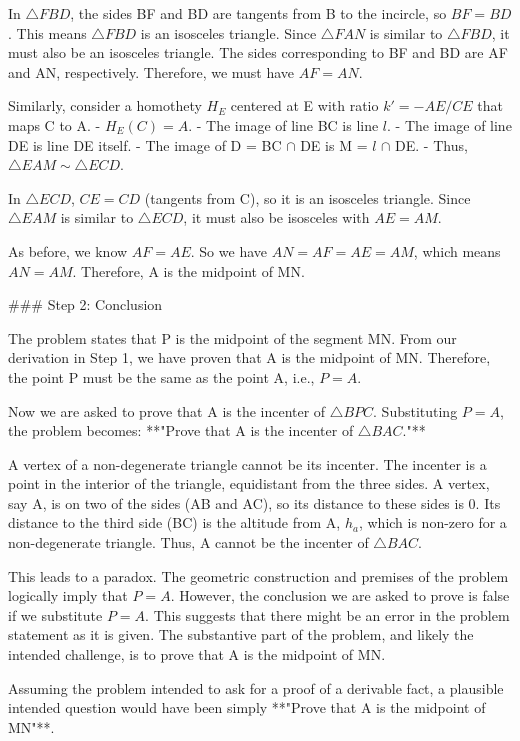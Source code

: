 In $\triangle FBD$, the sides BF and BD are tangents from B to the incircle, so $BF = BD$. This means $\triangle FBD$ is an isosceles triangle.
Since $\triangle FAN$ is similar to $\triangle FBD$, it must also be an isosceles triangle. The sides corresponding to BF and BD are AF and AN, respectively. Therefore, we must have $AF = AN$.

Similarly, consider a homothety $H_E$ centered at E with ratio $k' = -AE/CE$ that maps C to A.
-   $H_E(C) = A$.
-   The image of line BC is line $l$.
-   The image of line DE is line DE itself.
-   The image of D = BC $\cap$ DE is M = $l$ $\cap$ DE.
-   Thus, $\triangle EAM \sim \triangle ECD$.

In $\triangle ECD$, $CE = CD$ (tangents from C), so it is an isosceles triangle.
Since $\triangle EAM$ is similar to $\triangle ECD$, it must also be isosceles with $AE=AM$.

As before, we know $AF=AE$. So we have $AN = AF = AE = AM$, which means $AN = AM$.
Therefore, A is the midpoint of MN.

### Step 2: Conclusion

The problem states that P is the midpoint of the segment MN. From our derivation in Step 1, we have proven that A is the midpoint of MN. Therefore, the point P must be the same as the point A, i.e., $P=A$.

Now we are asked to prove that A is the incenter of $\triangle BPC$.
Substituting $P=A$, the problem becomes: **"Prove that A is the incenter of $\triangle BAC$."**

A vertex of a non-degenerate triangle cannot be its incenter. The incenter is a point in the interior of the triangle, equidistant from the three sides. A vertex, say A, is on two of the sides (AB and AC), so its distance to these sides is 0. Its distance to the third side (BC) is the altitude from A, $h_a$, which is non-zero for a non-degenerate triangle. Thus, A cannot be the incenter of $\triangle BAC$.

This leads to a paradox. The geometric construction and premises of the problem logically imply that $P=A$. However, the conclusion we are asked to prove is false if we substitute $P=A$. This suggests that there might be an error in the problem statement as it is given. The substantive part of the problem, and likely the intended challenge, is to prove that A is the midpoint of MN.

Assuming the problem intended to ask for a proof of a derivable fact, a plausible intended question would have been simply **"Prove that A is the midpoint of MN"**.